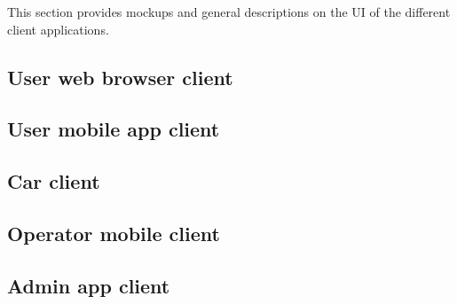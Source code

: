 This section provides mockups and general descriptions on the UI of the different client applications.

\subsection{User web browser client}

\subsection{User mobile app client}

\subsection{Car client}

\subsection{Operator mobile client}

\subsection{Admin app client}
